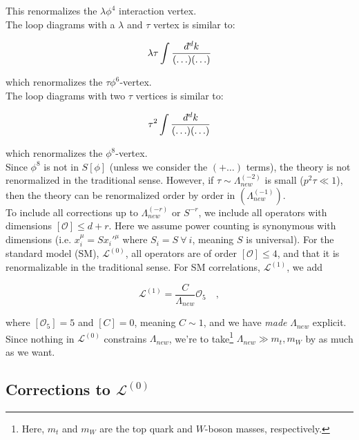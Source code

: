 \documentclass[10pt]{article}
\begin{document}
	This renormalizes the $\lambda\phi^4$ interaction vertex.\\
	
	The loop diagrams with a $\lambda$ and $\tau$ vertex is similar to:
	
	\begin{equation}
		\lambda\tau\int \frac{d\hspace*{-0.08em}\bar{}\hspace*{0.1em}^d k}{(\ldots)(\ldots)}	
	\end{equation}
	
	which renormalizes the $\tau\phi^6$-vertex.\\
	The loop diagrams with two $\tau$ vertices is similar to:
	
	\begin{equation}
	\tau^2\int \frac{d\hspace*{-0.08em}\bar{}\hspace*{0.1em}^d k}{(\ldots)(\ldots)}	
	\end{equation}
	
	which renormalizes the $\phi^8$-vertex.\\
	Since $\phi^8$ is not in $S[\phi]$ (unless we consider the $(+\ldots)$ terms), the theory is not renormalized in the traditional sense. However, if $\tau\sim \Lambda_{new}^{(-2)}$ is small ($p^2\tau \ll 1$), then the theory can be renormalized order by order in $(\Lambda_{new}^{(-1)})$.\\
	To include all corrections up to $\Lambda_{new}^{(-r)}$ or $S^{-r}$, we include all operators with dimensions $[\mathcal{O}] \leq d+r$. Here we assume power counting is synonymous with dimensions (i.e. $x_i^\mu = Sx_i'^\mu$ where $S_i=S\:\forall\:i$, meaning $S$ is universal). For the standard model (SM), $\mathcal{L}^{(0)}$, all operators are of order $[\mathcal{O}]\leq 4$, and that it is renormalizable in the traditional sense. For SM correlations, $\mathcal{L}^{(1)}$, we add
	
	\begin{equation}
		\mathcal{L}^{(1)} = \frac{C}{\Lambda_{new}}\mathcal{O}_5 \quad,
	\end{equation}
	
	where $[\mathcal{O}_5] = 5$ and $[C] = 0$, meaning $C\sim 1$, and we have \emph{made} $\Lambda_{new}$ explicit.\\
	Since nothing in $\mathcal{L}^{(0)}$ constrains $\Lambda_{new}$, we're to take\footnote{Here, $m_t$ and $m_W$ are the top quark and $W$-boson masses, respectively.} $\Lambda_{new} \gg m_t,m_W$ by as much as we want.
	
	\subsection{Corrections to $\mathcal{L}^{(0)}$}
	
\end{document}
